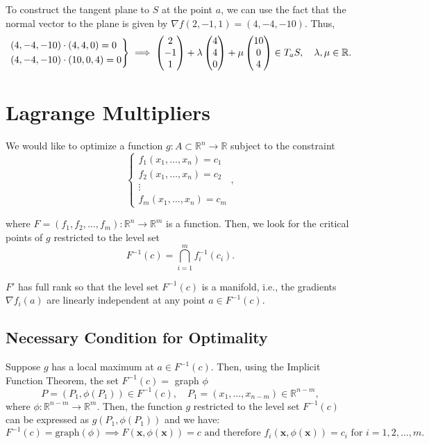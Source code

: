\documentclass[11pt]{article}
\begin{document}
To construct the tangent plane to \(S\) at the point \(a\), we can use the fact that the normal vector to the plane is given by \(\nabla f(2, -1, 1) = (4, -4, -10)\). Thus,
\[\begin{rcases}
    (4, -4, -10) \cdot (4, 4, 0) = 0 \\
    (4, -4, -10) \cdot (10, 0, 4) = 0
\end{rcases} \implies \begin{pmatrix}
2 \\ -1 \\ 1
\end{pmatrix} + \lambda \begin{pmatrix}
4 \\ 4 \\ 0
\end{pmatrix} + \mu \begin{pmatrix}
10 \\ 0 \\ 4
\end{pmatrix} \in T_a S, \quad \lambda, \mu \in \mathbb{R}.
\]
\pagebreak
\section{Lagrange Multipliers}
We would like to optimize a function \(g : A \subset \mathbb{R}^n \to \mathbb{R}\) subject to the constraint 
\[\begin{cases}
f_1(x_1, \dots, x_n) = c_1 \\
f_2(x_1, \dots, x_n) = c_2 \\
\vdots \\
f_m(x_1, \dots, x_n) = c_m
\end{cases},\]

where \(F = (f_1, f_2, \dots, f_m) : \mathbb{R}^n \to \mathbb{R}^m\) is a function. Then, we look for the critical points of \(g\) restricted to the level set
\[F^{-1}(c) = \bigcap_{i=1}^m f_i^{-1}(c_i).\]

\(F'\) has full rank so that the level set \(F^{-1}(c)\) is a manifold, i.e., the gradients \(\nabla f_i(a)\) are linearly independent at any point \(a \in F^{-1}(c)\). 
 
\subsection{Necessary Condition for Optimality}

Suppose \(g\) has a local maximum at \(a \in F^{-1}(c)\). Then, using the Implicit Function Theorem, the set \(F^{-1} (c) = \) graph \(\phi\)
\[P = (P_1, \phi(P_1)) \in F^{-1}(c), \quad P_1 = (x_1, \dots, x_{n-m}) \in \mathbb{R}^{n - m},\]
where \(\phi : \mathbb{R}^{n - m} \to \mathbb{R}^m\). Then, the function \(g\) restricted to the level set \(F^{-1}(c)\) can be expressed as \(g(P_1, \phi(P_1))\) and we have:
\[F^{-1}(c) = \text{graph}(\phi) \implies F(\mathbf{x}, \phi(\mathbf{x})) = c \text{ and therefore } f_i(\mathbf{x}, \phi(\mathbf{x})) = c_i \text{ for } i = 1, 2, \dots, m.\]
\end{document}
